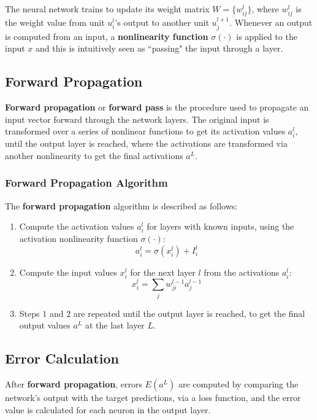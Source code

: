 The neural network trains to update its weight matrix $W = \Big \{ w_{ij}^l \Big \}$, where $w_{ij}^l$ is the weight value from unit $u_i^l$'s output to another unit $u_j^{l+1}$. Whenever an output is computed from an input, a \textbf{nonlinearity function} $\sigma(\cdot)$ is applied to the input $x$ and this is intuitively seen as ``passing" the input through a layer.


\subsection{Forward Propagation}

\textbf{Forward propagation} or \textbf{forward pass} is the procedure used to propagate an input vector forward through the network layers. The original input is transformed over a series of nonlinear functions to get its activation values $a_i^l$, until the output layer is reached, where the activations are transformed via another nonlinearity to get the final activations $a^L$. 

\subsubsection{Forward Propagation Algorithm}

The \textbf{forward propagation} algorithm is described as follows: 

\begin{enumerate}
    \item Compute the activation values $a_i^l$ for layers with known inputs, using the activation nonlinearity function $\sigma(\cdot)$: 
    $$
    a_i^l = \sigma(x_i^l) + I_i^l
    $$
    
    \item Compute the input values $x_i^l$ for the next layer $l$ from the activations $a_i^l$: 
    $$
    x_i^l = \sum_j w_{ji}^{l-1} a_j^{l-1}
    $$
    
    \item Steps $1$ and $2$ are repeated until the output layer is reached, to get the final output values $a^L$ at the last layer $L$.
\end{enumerate}


\subsection{Error Calculation}

After \textbf{forward propagation}, errors $E(a^L)$ are computed by comparing the network's output with the target predictions, via a loss function, and the error value is calculated for each neuron in the output layer. 

